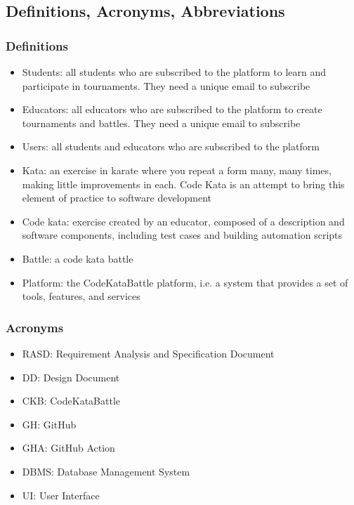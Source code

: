 \subsection{Definitions, Acronyms, Abbreviations}
\subsubsection{Definitions}
\begin{itemize}
    \item Students: all students who are subscribed to the platform to learn and participate in tournaments. They need a unique email to subscribe
    \item Educators: all educators who are subscribed to the platform to create tournaments and battles. They need a unique email to subscribe
    \item Users: all students and educators who are subscribed to the platform
    \item Kata: an exercise in karate where you repeat a form many, many times, making little improvements in each. Code Kata is an attempt to bring this element of practice to software development
    \item Code kata: exercise created by an educator, composed of a description and software components, including test cases and building automation scripts
    \item Battle: a code kata battle
    \item Platform: the CodeKataBattle platform, i.e. a system that provides a set of tools, features, and services
\end{itemize}

\subsubsection{Acronyms}
\begin{itemize}
    \item RASD: Requirement Analysis and Specification Document
    \item DD: Design Document
    \item CKB: CodeKataBattle
    \item GH: GitHub
    \item GHA: GitHub Action
    \item DBMS: Database Management System
    \item UI: User Interface
\end{itemize}

